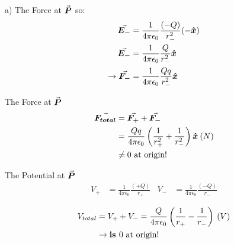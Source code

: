 \documentclass{beamer}
\newcommand{\kk}{\frac{1}{4\pi\epsilon_0}}
\begin{document}
\begin{frame}{a) The Force at $ \va*{P}$}
\Large
	\centering so:
	\begin{align*}
		\va*{E_{-}} &= \frac{1}{4 \pi \epsilon_0} \frac{\left( -Q \right)}{r_{-}^{2}} (-\vu*{x}) \\
		\va*{E_{-}} &= \frac{1}{4 \pi \epsilon_0} \frac{Q }{r_{-}^{2}} \vu*{x}\\
		\rightarrow \va*{F_{-}} &= \frac{1}{4 \pi \epsilon_0} \frac{Q q}{r_{-}^{2}} \vu*{x}  
	\end{align*}
\end{frame}
\begin{frame}{The Force at $\va*{P}$}
	\Large 
	\begin{align*}
		\va*{F_{total}} &= \va*{F_{+}} + \va*{F_{-}} \\
		&= \frac{Qq}{4\pi \epsilon_0} \left( \frac{1}{r_{+}^{2}} + \frac{1}{r_{-}^{2}}   \right)\vu*{x} \: (N)\\
		&\neq 0 \text{ at origin!}
	\end{align*}
\end{frame}
\begin{frame}{The Potential at $ \va*{P}$}
\Large
	\begin{align*}
		V_{+} &= \kk{} \frac{\left( +Q \right)}{r_{+}}  &V_{-} &= \kk \frac{\left( -Q \right)}{r_{-}}\\  
	\end{align*}
	\begin{align*}
		V_{total} &=  V_{+}+V_{-} = \frac{Q}{4\pi\epsilon_0}\left( \frac{1}{r_{+}}- \frac{1}{r_{-}}   \right) \: (V) \\
		&\rightarrow \text{\textbf{is }} 0 \text{ at origin!}
	\end{align*}
\end{frame}
\end{document}
